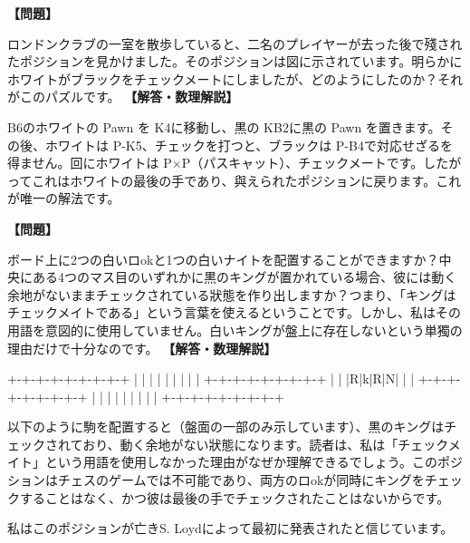 \documentclass[10pt,a4paper,oneside,openany]{ltjsbook}
\begin{document}
\begin{tcolorbox}[colback=softblue,colframe=primaryblue,title=\textbf{第 355 問：チェックマテ! （原題: CHECKMATE!）},arc=2mm,boxrule=1pt,breakable]
\textbf{【問題】}\par\vspace{0.3em}
ロンドンクラブの一室を散歩していると、二名のプレイヤーが去った後で殘されたポジションを見かけました。そのポジションは図に示されています。明らかにホワイトがブラックをチェックメートにしましたが、どのようにしたのか？それがこのパズルです。
\tcblower
\textbf{【解答・数理解説】}\par\vspace{0.3em}
B6のホワイトの Pawn を K4に移動し、黒の KB2に黒の Pawn を置きます。その後、ホワイトは P-K5、チェックを打つと、ブラックは P-B4で対応せざるを得ません。回にホワイトは P×P（パスキャット）、チェックメートです。したがってこれはホワイトの最後の手であり、與えられたポジションに戻ります。これが唯一の解法です。
\end{tcolorbox}

\begin{tcolorbox}[colback=softblue,colframe=primaryblue,title=\textbf{第 356 問：queer chess （原題: QUEER CHESS.）},arc=2mm,boxrule=1pt,breakable]
\textbf{【問題】}\par\vspace{0.3em}
ボード上に2つの白いロokと1つの白いナイトを配置することができますか？中央にある4つのマス目のいずれかに黒のキングが置かれている場合、彼には動く余地がないままチェックされている狀態を作り出しますか？つまり、「キングはチェックメイトである」という言葉を使えるということです。しかし、私はその用語を意図的に使用していません。白いキングが盤上に存在しないという単獨の理由だけで十分なのです。
\tcblower
\textbf{【解答・数理解説】}\par\vspace{0.3em}
+-+-+-+-+-+-+-+-+
    | | | | | | | | |
    +-+-+-+-+-+-+-+-+
    | | |R|k|R|N| | |
    +-+-+-+-+-+-+-+-+
    | | | | | | | | |
    +-+-+-+-+-+-+-+-+

以下のように駒を配置すると（盤面の一部のみ示しています）、黒のキングはチェックされており、動く余地がない狀態になります。読者は、私は「チェックメイト」という用語を使用しなかった理由がなぜか理解できるでしょう。このポジションはチェスのゲームでは不可能であり、両方のロokが同時にキングをチェックすることはなく、かつ彼は最後の手でチェックされたことはないからです。

私はこのポジションが亡きS. Loydによって最初に発表されたと信じています。
\end{tcolorbox}
\end{document}
